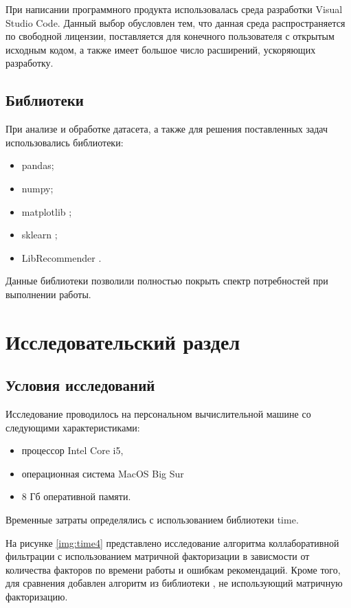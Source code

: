 \documentclass[12pt]{report}
\begin{document}
При написании программного продукта использовалась среда разработки Visual Studio Code. Данный выбор обусловлен тем, что данная среда распространяется по свободной лицензии, поставляется для конечного пользователя с открытым исходным кодом, а также имеет большое число расширений, ускоряющих разработку.

\section{Библиотеки}

При анализе и обработке датасета, а также для решения поставленных задач использовались библиотеки:
\begin{itemize}
	\item pandas;
	\item numpy;
	\item matplotlib \cite{matplotlib};
	\item sklearn \cite{sklearn};
    \item LibRecommender \cite{libreco}.
\end{itemize}

Данные библиотеки позволили полностью покрыть спектр потребностей при выполнении работы.


\chapter{Исследовательский раздел}
\section{Условия исследований}
Исследование проводилось на персональном вычислительной машине со следующими характеристиками:

\begin{itemize}
\item процессор Intel Core i5,
\item операционная система MacOS Big Sur
\item 8 Гб оперативной памяти.
\end{itemize}

Временные затраты определялись с использованием библиотеки time.

На рисунке \ref{img:time4} представлено исследование алгоритма коллаборативной фильтрации с использованием матричной факторизации в зависмости от количества факторов по времени работы и ошибкам рекомендаций. Кроме того, для сравнения добавлен алгоритм из библиотеки \cite{libreco}, не использующий матричную факторизацию.
\end{document}
